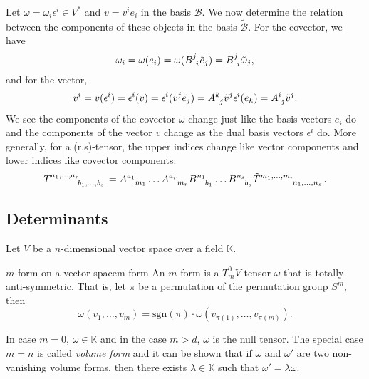 Let \(\omega = \omega_i \epsilon^i \in V ^{\ast}\) and \(v = v^i e_i\) in the basis \(\mathcal{B}\). We now determine the relation between the components of these objects in the basis \(\tilde{\mathcal{B}}\). For the covector, we have
\begin{equation*}
    \omega_i = \omega(e_i) = \omega(B\indices{^j_i}\tilde{e}_j) = B\indices{^j_i}\tilde{\omega}_j,
\end{equation*}
and for the vector,
\begin{equation*}
    v^i = v(\epsilon^i) = \epsilon^i(v) = \epsilon^i(\tilde{v}^j \tilde{e}_j) = A\indices{^k_j} \tilde{v}^j \epsilon^i(e_k) = A\indices{^i_j}\tilde{v}^j.
\end{equation*}
We see the components of the covector \(\omega\) change just like the basis vectors \(e_i\) do and the components of the vector \(v\) change as the dual basis vectors \(\epsilon^i\) do. More generally, for a (r,s)-tensor, the upper indices change like vector components and lower indices like covector components:
\begin{equation*}
    T\indices{^{a_1,\dots,a_r}_{b_1,\dots,b_s}} = A\indices{^{a_1}_{m_1}}\dots A\indices{^{a_r}_{m_r}} B\indices{^{n_1}_{b_1}} \dots B\indices{^{n_s}_{b_s}} \tilde{T}\indices{^{m_1, \dots, m_r}_{n_1, \dots, n_s}}.
\end{equation*}

\subsection{Determinants}

Let \(V\) be a \(n\)-dimensional vector space over a field \(\mathbb{K}\).

\begin{definition}{\(m\)-form on a vector space}{m-form}
    An \(m\)-form is a \(T_m^0V\) tensor \(\omega\) that is totally anti-symmetric. That is, let \(\pi\) be a permutation of the permutation group \(S^m\), then
    \begin{equation*}
        \omega(v_1, \dots, v_m) = \mathrm{sgn}(\pi)\cdot \omega(v_{\pi(1)}, \dots, v_{\pi(m)}).
    \end{equation*}
\end{definition}
\begin{remark}
    In case \(m = 0\), \(\omega \in \mathbb{K}\) and in the case \(m > d\), \(\omega\) is the null tensor. The special case \(m = n\) is called \emph{volume form} and it can be shown that if \(\omega\) and \(\omega'\) are two non-vanishing volume forms, then there exists \(\lambda \in \mathbb{K}\) such that \(\omega' = \lambda\omega\).
\end{remark}

